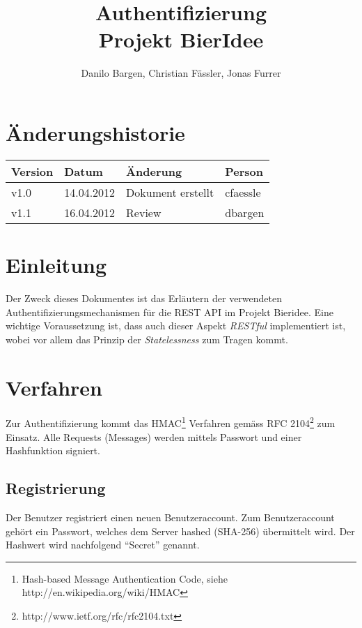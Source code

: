 \documentclass[10pt,a4paper]{scrartcl}
\author{Danilo Bargen, Christian Fässler, Jonas Furrer}
\title{Authentifizierung\\ Projekt BierIdee}
\begin{document}
\begin{titlepage}
	\maketitle
	\vspace{120mm}
	\thispagestyle{empty} %
\end{titlepage}

\tableofcontents
\newpage

\section*{Änderungshistorie}
\begin{tabular}{p{}p{}p{}p{}}
\toprule
\textbf{Version} & \textbf{Datum} & \textbf{Änderung} & \textbf{Person} \\  
\midrule
v1.0 & 14.04.2012 & Dokument erstellt & cfaessle \\  
\hline 
v1.1 & 16.04.2012 & Review & dbargen \\
\bottomrule
\end{tabular} 
\newpage


\section{Einleitung}
Der Zweck dieses Dokumentes ist das Erläutern der verwendeten Authentifizierungsmechanismen für die
REST API im Projekt Bieridee. Eine wichtige Voraussetzung ist, dass auch dieser Aspekt
\textit{RESTful} implementiert ist, wobei vor allem das Prinzip der \textit{Statelessness} zum
Tragen kommt.


\section{Verfahren}
Zur Authentifizierung kommt das HMAC\footnote{Hash-based Message Authentication Code, siehe
http://en.wikipedia.org/wiki/HMAC} Verfahren gemäss
RFC 2104\footnote{http://www.ietf.org/rfc/rfc2104.txt} zum Einsatz. Alle Requests (Messages) werden
mittels Passwort und einer Hashfunktion signiert.

\subsection{Registrierung}
Der Benutzer registriert einen neuen Benutzeraccount.
Zum Benutzeraccount gehört ein Passwort, welches dem Server hashed (SHA-256) übermittelt wird.
Der Hashwert wird nachfolgend "`Secret"' genannt. 
\end{document}
